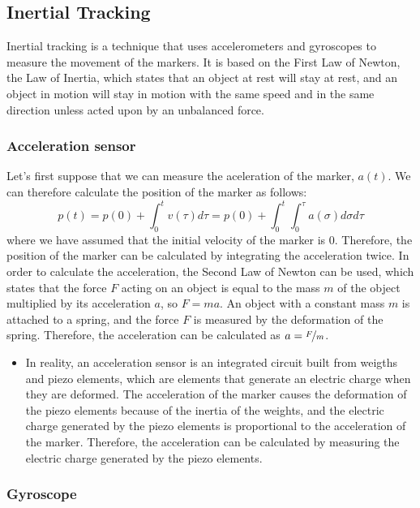 \subsection{Inertial Tracking}

Inertial tracking is a technique that uses accelerometers and gyroscopes to measure the movement of the markers. It is based on the First Law of Newton, the Law of Inertia, which states that an object at rest will stay at rest, and an object in motion will stay in motion with the same speed and in the same direction unless acted upon by an unbalanced force.

\subsubsection{Acceleration sensor}

Let's first suppose that we can measure the aceleration of the marker, $a(t)$. We can therefore calculate the position of the marker as follows:
\begin{equation*}
    p(t)=p(0)+\int_0^t v(\tau)d\tau=p(0)+\int_0^t\int_0^\tau a(\sigma)d\sigma d\tau
\end{equation*}
where we have assumed that the initial velocity of the marker is $0$. Therefore, the position of the marker can be calculated by integrating the acceleration twice. In order to calculate the acceleration, the Second Law of Newton can be used, which states that the force $F$ acting on an object is equal to the mass $m$ of the object multiplied by its acceleration $a$, so $F=ma$. An object with a constant mass $m$ is attached to a spring, and the force $F$ is measured by the deformation of the spring. Therefore, the acceleration can be calculated as $a=\nicefrac{F}{m}$.
\begin{itemize}
    \item In reality, an acceleration sensor is an integrated circuit built from weigths and piezo elements, which are elements that generate an electric charge when they are deformed. The acceleration of the marker causes the deformation of the piezo elements because of the inertia of the weights, and the electric charge generated by the piezo elements is proportional to the acceleration of the marker. Therefore, the acceleration can be calculated by measuring the electric charge generated by the piezo elements.
\end{itemize}

\subsubsection{Gyroscope}

